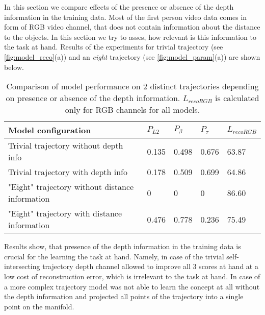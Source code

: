 In this section we compare effects of the presence or absence of the depth information in the training data. Most of the first person video data comes in form of RGB video channel, that does not contain information about the distance to the objects. In this section we try to asses, how relevant is this information to the task at hand. Results of the experiments for trivial trajectory (see \ref{fig:model_reco}(a)) and an \textit{eight} trajectory (see \ref{fig:model_param}(a)) are shown below.

\begin{table}
\begin{center}
    \begin{tabular}{| l | l | l | l | l |}
      \hline
     Model configuration  &  $P_{L2}$ & $P_{\beta}$ & $P_{\tau}$ & $L_{recoRGB}$ \\ \hline
     Trivial trajectory without depth info		& 0.135 & 0.498 & 0.676 & 63.87 \\
     Trivial trajectory with depth info 		& 0.178 & 0.509 & 0.699 & 64.86 \\ \hline
     "Eight" trajectory without distance information	 	& 0 & 0 & 0 & 86.60 \\
     "Eight" trajectory with distance information		   & 0.476 & 0.778 & 0.236 & 75.49 \\ \hline
    \end{tabular}
\end{center}
  \caption{Comparison of model performance on 2 distinct trajectories depending on presence or absence of the depth information. $L_{recoRGB}$ is calculated only for RGB channels for all models.}
  \label{tab:depth}
\end{table}

Results show, that presence of the depth information in the training data is crucial for the learning the task at hand. Namely, in case of the trivial self-intersecting trajectory depth channel allowed to improve all 3 scores at hand at a low cost of reconstruction error, which is irrelevant to the task at hand. In case of a more complex trajectory model was not able to learn the concept at all without the depth information and projected all points of the trajectory into a single point on the manifold.
